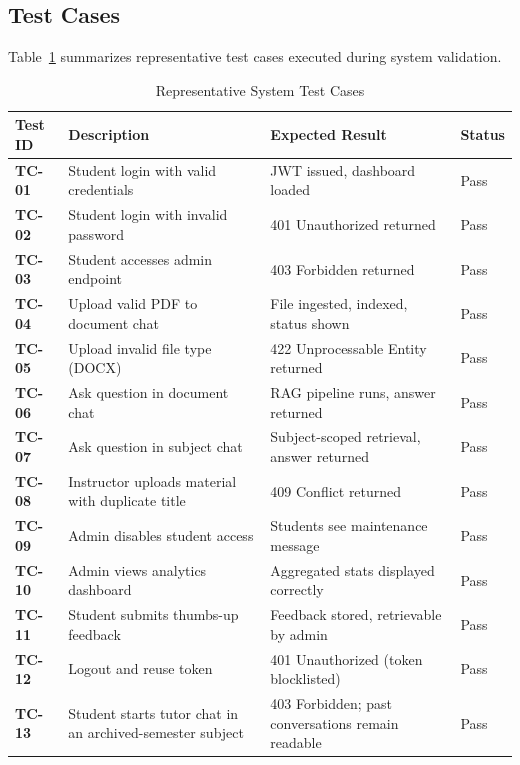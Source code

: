 \documentclass[12pt, a4paper, oneside]{report}
\let\oldsubsection\subsection
\renewcommand{\subsection}{%
  \addtocontents{toc}{\protect\needspace{3\baselineskip}}%
  \oldsubsection
}
\begin{document}
\newpage

\subsection{Test Cases}

Table~\ref{tab:test_cases} summarizes representative test cases executed during system validation.

\begin{table}[H]
\centering
\caption{Representative System Test Cases}
\label{tab:test_cases}
\begin{tabular}{>{\bfseries}p{1.5cm} p{4.5cm} p{4cm} p{3cm}}
\toprule
Test ID & Description & Expected Result & Status \\
\midrule
TC-01 & Student login with valid credentials & JWT issued, dashboard loaded & Pass \\
TC-02 & Student login with invalid password & 401 Unauthorized returned & Pass \\
TC-03 & Student accesses admin endpoint & 403 Forbidden returned & Pass \\
TC-04 & Upload valid PDF to document chat & File ingested, indexed, status shown & Pass \\
TC-05 & Upload invalid file type (DOCX) & 422 Unprocessable Entity returned & Pass \\
TC-06 & Ask question in document chat & RAG pipeline runs, answer returned & Pass \\
TC-07 & Ask question in subject chat & Subject-scoped retrieval, answer returned & Pass \\
TC-08 & Instructor uploads material with duplicate title & 409 Conflict returned & Pass \\
TC-09 & Admin disables student access & Students see maintenance message & Pass \\
TC-10 & Admin views analytics dashboard & Aggregated stats displayed correctly & Pass \\
TC-11 & Student submits thumbs-up feedback & Feedback stored, retrievable by admin & Pass \\
TC-12 & Logout and reuse token & 401 Unauthorized (token blocklisted) & Pass \\
TC-13 & Student starts tutor chat in an archived-semester subject & 403 Forbidden; past conversations remain readable & Pass \\
\bottomrule
\end{tabular}
\end{table}

\newpage
\end{document}
